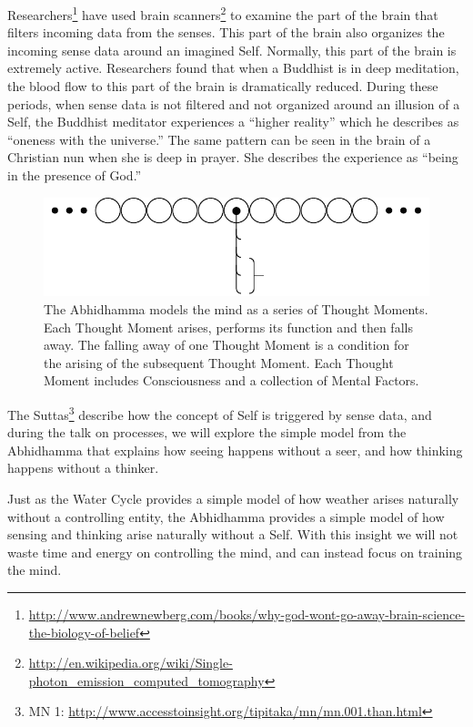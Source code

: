 Researchers\footnote{\url{http://www.andrewnewberg.com/books/why-god-wont-go-away-brain-science-the-biology-of-belief}} have used brain scanners\footnote{\url{http://en.wikipedia.org/wiki/Single-photon_emission_computed_tomography}} to examine the part of the brain that filters incoming data from the senses. This part of the brain also organizes the incoming sense data around an imagined Self. Normally, this part of the brain is extremely active. Researchers found that when a Buddhist is in deep meditation, the blood flow to this part of the brain is dramatically reduced. During these periods, when sense data is not filtered and not organized around an illusion of a Self, the Buddhist meditator experiences a “higher reality” which he describes as “oneness with the universe.” The same pattern can be seen in the brain of a Christian nun when she is deep in prayer. She describes the experience as “being in the presence of God.”

\begin{figure}[h]
\centering
\includegraphics[width=1\linewidth]{./Diagrams/Model}
\caption{The Abhidhamma models the mind as a series of Thought Moments. Each Thought Moment arises, performs its function and then falls away. The falling away of one Thought Moment is a condition for the arising of the subsequent Thought Moment. Each Thought Moment includes Consciousness and a collection of Mental Factors.}
\label{fig:Model}
\end{figure}

The Suttas\footnote{MN 1: \url{http://www.accesstoinsight.org/tipitaka/mn/mn.001.than.html}} describe how the concept of Self is triggered by sense data, and during the talk on processes, we will explore the simple model from the Abhidhamma that explains how seeing happens without a seer, and how thinking happens without a thinker.

Just as the Water Cycle provides a simple model of how weather arises naturally without a controlling entity, the Abhidhamma provides a simple model of how sensing and thinking arise naturally without a Self. With this insight we will not waste time and energy on controlling the mind, and can instead focus on training the mind.

